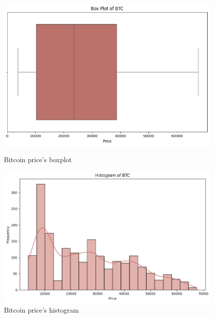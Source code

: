 \documentclass{ieeeojies}
\begin{document}
\begin{figure}[H]
	\centering
	\begin{minipage}{0.23\textwidth}
		\centering
		\includegraphics[width=1\textwidth]{bibliography/Figure/BTC_BoxPlot.PNG}
		\caption{Bitcoin price's boxplot}
		\label{fig:1}
	\end{minipage}
	\hfill
	\begin{minipage}{0.23\textwidth}
		\centering
		\includegraphics[width=1\textwidth]{bibliography/Figure/BTC_Histogram.PNG}
		\caption{Bitcoin price's histogram}
		\label{fig:2}
	\end{minipage}
\end{figure}
\end{document}
